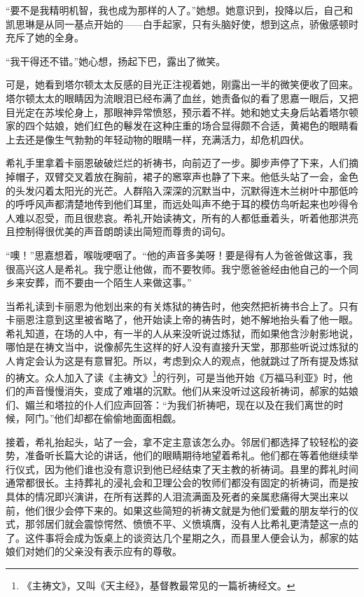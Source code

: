 \par “要不是我精明机智，我也成为那样的人了。”她想。她意识到，投降以后，自己和凯思琳是从同一基点开始的——白手起家，只有头脑好使，想到这点，骄傲感顿时充斥了她的全身。
\par “我干得还不错。”她心想，扬起下巴，露出了微笑。
\par 可是，她看到塔尔顿太太反感的目光正注视着她，刚露出一半的微笑便收了回来。塔尔顿太太的眼睛因为流眼泪已经布满了血丝，她责备似的看了思嘉一眼后，又把目光定在苏埃伦身上，那眼神异常愤怒，预示着不祥。她和她丈夫身后站着塔尔顿家的四个姑娘，她们红色的鬈发在这种庄重的场合显得颇不合适，黄褐色的眼睛看上去还是像生气勃勃的年轻动物的眼睛一样，充满活力，却危机四伏。
\par 希礼手里拿着卡丽恩破破烂烂的祈祷书，向前迈了一步。脚步声停了下来，人们摘掉帽子，双臂交叉着放在胸前，裙子的窸窣声也静了下来。他低头站了一会，金色的头发闪着太阳光的光芒。人群陷入深深的沉默当中，沉默得连木兰树叶中那低吟的呼呼风声都清楚地传到他们耳里，而远处叫声不绝于耳的模仿鸟听起来也吵得令人难以忍受，而且很悲哀。希礼开始读祷文，所有的人都低垂着头，听着他那洪亮且控制得很优美的声音朗朗读出简短而尊贵的词句。
\par “噢！”思嘉想着，喉咙哽咽了。“他的声音多美呀！要是得有人为爸爸做这事，我很高兴这人是希礼。我宁愿让他做，而不要牧师。我宁愿爸爸经由他自己的一个同乡来安葬，而不要由一个陌生人来做这事。”
\par 当希礼读到卡丽恩为他划出来的有关炼狱的祷告时，他突然把祈祷书合上了。只有卡丽恩注意到这里被省略了，他开始读上帝的祷告时，她不解地抬头看了他一眼。希礼知道，在场的人中，有一半的人从来没听说过炼狱，而如果他含沙射影地说，哪怕是在祷文当中，说像郝先生这样的好人没有直接升天堂，那那些听说过炼狱的人肯定会认为这是有意冒犯。所以，考虑到众人的观点，他就跳过了所有提及炼狱的祷文。众人加入了读《主祷文》\footnote{《主祷文》，又叫《天主经》，基督教最常见的一篇祈祷经文。}的行列，可是当他开始《万福马利亚》时，他们的声音慢慢消失，变成了难堪的沉默。他们从来没听过这段祈祷词，郝家的姑娘们、媚兰和塔拉的仆人们应声回答：“为我们祈祷吧，现在以及在我们离世的时候，阿门。”他们却都在偷偷地面面相觑。
\par 接着，希礼抬起头，站了一会，拿不定主意该怎么办。邻居们都选择了较轻松的姿势，准备听长篇大论的讲话，他们的眼睛期待地望着希礼。他们都在等着他继续举行仪式，因为他们谁也没有意识到他已经结束了天主教的祈祷词。县里的葬礼时间通常都很长。主持葬礼的浸礼会和卫理公会的牧师们都没有固定的祈祷词，而是按具体的情况即兴演讲，在所有送葬的人泪流满面及死者的亲属悲痛得大哭出来以前，他们很少会停下来的。如果这些简短的祈祷文就是为他们爱戴的朋友举行的仪式，那邻居们就会震惊愕然、愤愤不平、义愤填膺，没有人比希礼更清楚这一点的了。这件事将会成为饭桌上的谈资达几个星期之久，而县里人便会认为，郝家的姑娘们对她们的父亲没有表示应有的尊敬。
